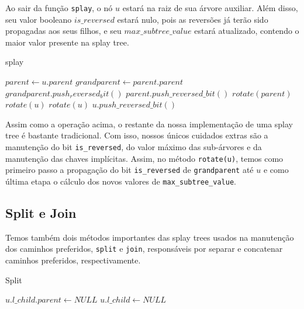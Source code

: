 Ao sair da função \texttt{splay}, o nó $u$ estará na raiz de sua árvore auxiliar. Além disso, seu valor booleano $is\_reversed$ estará nulo, pois as reversões já terão sido propagadas aos seus filhos, e seu $max\_subtree\_value$ estará atualizado, contendo o maior valor presente na splay tree.

\begin{algorithm}[h!]
    \caption{splay}\label{splay:splay}
    \begin{algorithmic}
         
        \State $parent \gets u.parent$
        \State $grandparent \gets parent.parent$
        \State $grandparent.push_reversed_bit()$
        \State $parent.push\_reversed\_bit()$
        \State $rotate(parent)$
        \Else
        \State $rotate(u)$
        \EndIf
        \EndIf
        \State $rotate(u)$
        \EndWhile
        \State $u.push\_reversed\_bit()$
        \EndFunction
    \end{algorithmic}
\end{algorithm}

Assim como a operação acima, o restante da nossa implementação de uma splay tree é bastante tradicional. Com isso, nossos únicos cuidados extras são a manutenção do bit \texttt{is\_reversed}, do valor máximo das sub-árvores e da manutenção das chaves implícitas. Assim, no método \texttt{rotate(u)}, temos como primeiro passo a propagação do bit \texttt{is\_reversed} de \texttt{grandparent} até $u$ e como última etapa o cálculo dos novos valores de \texttt{max\_subtree\_value}.

\subsection{Split e Join}
\label{subsection:lct-splay-split-join}

Temos também dois métodos importantes das splay trees usados na manutenção dos caminhos preferidos, \texttt{split} e \texttt{join}, responsáveis por separar e concatenar caminhos preferidos, respectivamente.

\begin{algorithm}[h!]
    \caption{Split}\label{splay:split}
    \begin{algorithmic}
        \State $u.l\_child.parent \gets NULL$
        \EndIf
        \State $u.l\_child \gets NULL$
        \EndFunction
    \end{algorithmic}
\end{algorithm}

